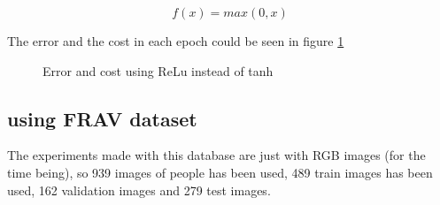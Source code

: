 \begin{equation}
f(x) = max(0,x)
\label{Relu-formula}
\end{equation}

The error and the cost in each epoch could be seen in figure \ref{fig:LENET_relu}

\begin{figure}[htb]
\centering

\caption{Error and cost using ReLu instead of tanh}
\label{fig:LENET_relu}
\end{figure}



\subsection{using FRAV dataset}
The experiments made with this database are just with RGB images (for the time being), so 939 images of people has been  used, 489 train images has been used, 162 validation images and 279 test images.\\

